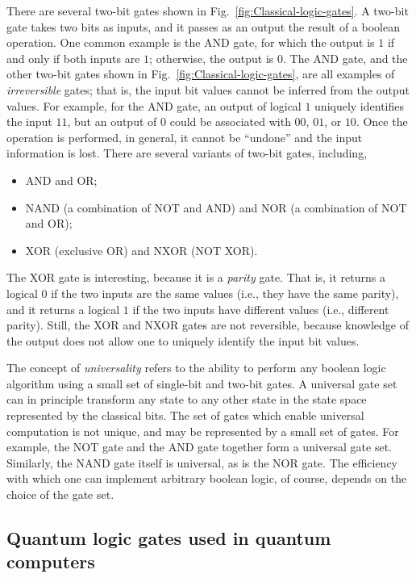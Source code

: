 \documentclass[aip,apr,twocolumn,showpacs,superscriptaddress,groupedaddress,nofootinbib,reprint]{revtex4-1}  %
\begin{document}
There are several two-bit gates shown in Fig.~\ref{fig:Classical-logic-gates}. A two-bit gate takes two bits as inputs, and it passes as an output the result of a boolean operation. One common example is the \textsf{AND} gate, for which the output is $1$ if and only if both inputs are $1$; otherwise, the output is $0$. The \textsf{AND} gate, and the other two-bit gates shown in Fig.~\ref{fig:Classical-logic-gates}, are all examples of \textit{irreversible} gates; that is, the input bit values cannot be inferred from the output values. For example, for the \textsf{AND} gate, an output of logical $1$ uniquely identifies the input $11$, but an output of $0$ could be associated with $00$, $01$, or $10$. Once the operation is performed, in general, it cannot be ``undone'' and the input information is lost.
%
\noindent There are several variants of two-bit gates, including,
\begin{itemize}
    \item \textsf{AND} and \textsf{OR};
    \item \textsf{NAND} (a combination of \textsf{NOT} and \textsf{AND}) and \textsf{NOR} (a combination of \textsf{NOT} and \textsf{OR});
    \item \textsf{XOR} (exclusive \textsf{OR}) and \textsf{NXOR} (\textsf{NOT XOR}).
\end{itemize}
%
The \textsf{XOR} gate is interesting, because it is a \textit{parity} gate. That is, it returns a logical $0$ if the two inputs are the same values (i.e., they have the same parity), and it returns a logical $1$ if the two inputs have different values (i.e., different parity). Still, the \textsf{XOR} and \textsf{NXOR} gates are not reversible, because knowledge of the output does not allow one to uniquely identify the input bit values.

The concept of \textit{universality} refers to the ability to perform any boolean logic algorithm using a small set of single-bit and two-bit gates. A universal gate set can in principle transform any state to any other state in the state space represented by the classical bits. The set of gates which enable universal computation is not unique, and may be represented by a small set of gates. For example, the \textsf{NOT} gate and the \textsf{AND} gate together form a universal gate set. Similarly, the \textsf{NAND} gate itself is universal, as is the \textsf{NOR} gate. The efficiency with which one can implement arbitrary boolean logic, of course, depends on the choice of the gate set.

\subsection{\label{sec:QuantumGatesInQC}Quantum logic gates used in quantum computers}
\end{document}
